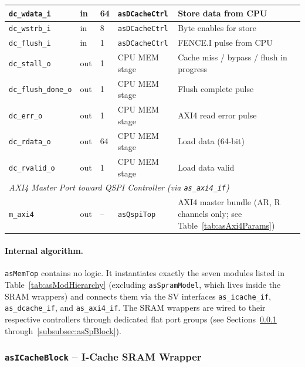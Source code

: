 \begin{table}[H]
\begin{tabularx}{\textwidth}{|l |l |l |l |X|}
  \hline
  \texttt{dc\_wdata\_i}       & in  & 64 & \texttt{asDCacheCtrl} & Store data from CPU \\
  \hline
  \texttt{dc\_wstrb\_i}       & in  & 8  & \texttt{asDCacheCtrl} & Byte enables for store \\
  \hline
  \texttt{dc\_flush\_i}       & in  & 1  & \texttt{asDCacheCtrl} & FENCE.I pulse from CPU \\
  \hline
  \texttt{dc\_stall\_o}       & out & 1  & CPU MEM stage         & Cache miss / bypass / flush in progress \\
  \hline
  \texttt{dc\_flush\_done\_o} & out & 1  & CPU MEM stage         & Flush complete pulse \\
  \hline
  \texttt{dc\_err\_o}         & out & 1  & CPU MEM stage         & AXI4 read error pulse \\
  \hline
  \texttt{dc\_rdata\_o}       & out & 64 & CPU MEM stage         & Load data (64-bit) \\
  \hline
  \texttt{dc\_rvalid\_o}      & out & 1  & CPU MEM stage         & Load data valid \\
  \hline
  \multicolumn{5}{|l|}{\textit{AXI4 Master Port toward QSPI Controller (via \texttt{as\_axi4\_if})}} \\
  \hline
  \texttt{m\_axi4}            & out & -- & \texttt{asQspiTop}    & AXI4 master bundle (AR, R channels only; see Table~\ref{tab:asAxi4Params}) \\
  \hline
\end{tabularx}
\end{table}

\paragraph{Internal algorithm.}
\texttt{asMemTop} contains no logic.
It instantiates exactly the seven modules listed in
Table~\ref{tab:asModHierarchy} (excluding \texttt{asSpramModel}, which
lives inside the SRAM wrappers) and connects them via the SV interfaces
\texttt{as\_icache\_if}, \texttt{as\_dcache\_if}, and \texttt{as\_axi4\_if}.
The SRAM wrappers are wired to their respective controllers through
dedicated flat port groups (see Sections~\ref{subsubsec:asICacheBlock}
through~\ref{subsubsec:asSpBlock}).

\subsubsection{\texttt{asICacheBlock} -- I-Cache SRAM Wrapper}
\label{subsubsec:asICacheBlock}


